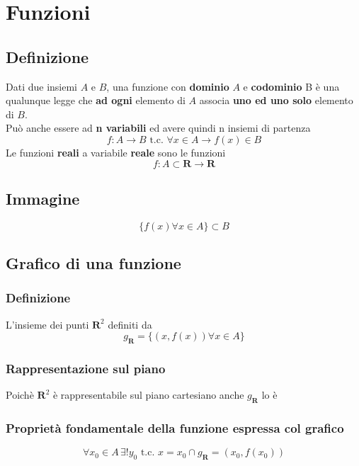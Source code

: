 \documentclass{report}
\begin{document}
\section{Funzioni}
    \subsection{Definizione}
        Dati due insiemi $A$ e $B$, una funzione con \textbf{dominio} $A$ e 
        \textbf{codominio} B è una qualunque legge che \textbf{ad ogni} elemento
        di $A$ associa \textbf{uno ed uno solo} elemento di $B$.\\
        Può anche essere ad \textbf{n variabili} ed avere quindi n insiemi di partenza
        $$f: A \longrightarrow B \textrm{ t.c. } \forall x \in A \longrightarrow f(x) \in B$$
        Le funzioni \textbf{reali} a variabile \textbf{reale} sono le funzioni
        $$f: A \subset \mathbf{R} \longrightarrow \mathbf{R}$$
    \subsection{Immagine}
        $$ \{f(x) \forall x \in A\} \subset B $$
    \subsection{Grafico di una funzione}
        \subsubsection{Definizione}
            L'insieme dei punti $\mathbf{R}^2$ definiti da 
            $$ g_{\mathbf{R}} = \{(x,f(x)) \forall x \in A\}$$
        \subsubsection{Rappresentazione sul piano}
            Poichè $\mathbf{R}^2$ è rappresentabile sul piano cartesiano anche 
            $g_{\mathbf{R}}$ lo è
        \subsubsection{Proprietà fondamentale della funzione espressa col grafico}
        $$\forall x_0 \in A \, \exists!y_0 \textrm{ t.c. } {x = x_0} \cap {g_{\mathbf{R}}}
            = {(x_0, f(x_0))}$$
\end{document}
